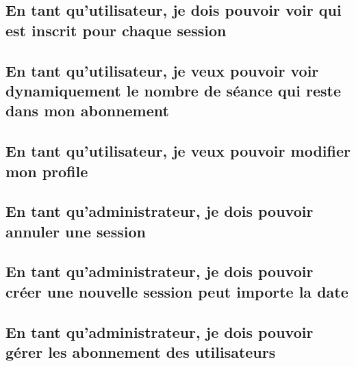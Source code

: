 	\vspace{\baselineskip}
	\subsection{En tant qu’utilisateur, je dois pouvoir voir qui est inscrit pour chaque session}
		
	
	\newpage
	\subsection{En tant qu’utilisateur, je veux pouvoir voir dynamiquement le nombre de séance qui reste dans mon abonnement}
		

	\vspace{\baselineskip}	
	\subsection{En tant qu'utilisateur, je veux pouvoir modifier mon profile}
		

	\vspace{\baselineskip}
	\subsection{En tant qu’administrateur, je dois pouvoir annuler une session}
		

	\newpage
	\subsection{En tant qu'administrateur, je dois pouvoir créer une nouvelle session peut importe la date}
		

	\vspace{\baselineskip}
	\vspace{\baselineskip}
	\subsection{En tant qu'administrateur, je dois pouvoir gérer les abonnement des utilisateurs}
		
